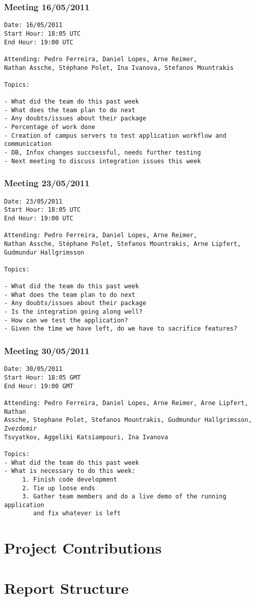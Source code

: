 \subsubsection{Meeting 16/05/2011}

\begin{verbatim}
Date: 16/05/2011
Start Hour: 18:05 UTC
End Hour: 19:00 UTC

Attending: Pedro Ferreira, Daniel Lopes, Arne Reimer,
Nathan Assche, Stéphane Polet, Ina Ivanova, Stefanos Mountrakis

Topics:

- What did the team do this past week
- What does the team plan to do next
- Any doubts/issues about their package
- Percentage of work done
- Creation of campus servers to test application workflow and communication
- DB, Infox changes succsessful, needs further testing
- Next meeting to discuss integration issues this week
\end{verbatim}

\subsubsection{Meeting 23/05/2011}

\begin{verbatim}
Date: 23/05/2011
Start Hour: 18:05 UTC
End Hour: 19:00 UTC

Attending: Pedro Ferreira, Daniel Lopes, Arne Reimer,
Nathan Assche, Stéphane Polet, Stefanos Mountrakis, Arne Lipfert, Gudmundur Hallgrimsson

Topics:

- What did the team do this past week
- What does the team plan to do next
- Any doubts/issues about their package
- Is the integration going along well?
- How can we test the application?
- Given the time we have left, do we have to sacrifice features?
\end{verbatim}

\subsubsection{Meeting 30/05/2011}

\begin{verbatim}
Date: 30/05/2011
Start Hour: 18:05 GMT
End Hour: 19:00 GMT

Attending: Pedro Ferreira, Daniel Lopes, Arne Reimer, Arne Lipfert, Nathan
Assche, Stephane Polet, Stefanos Mountrakis, Gudmundur Hallgrimsson, Zvezdomir
Tsvyatkov, Aggeliki Katsiampouri, Ina Ivanova

Topics:
- What did the team do this past week
- What is necessary to do this week:
     1. Finish code development
     2. Tie up loose ends
     3. Gather team members and do a live demo of the running application 
     	and fix whatever is left
\end{verbatim}


\section{Project Contributions}



\section{Report Structure}